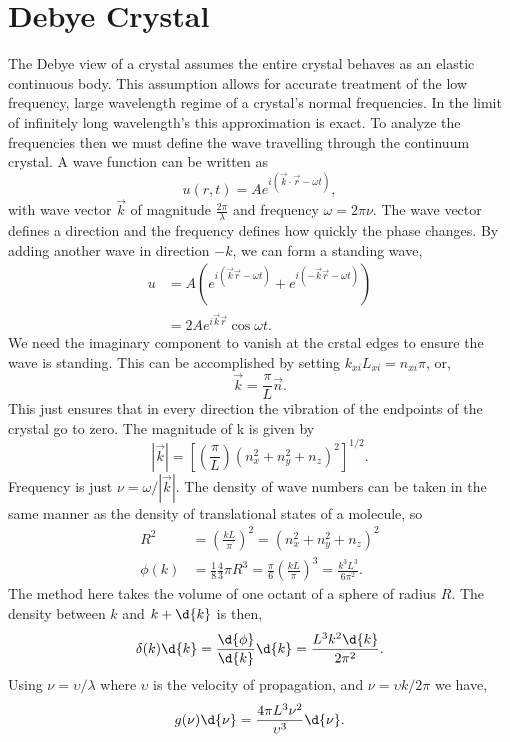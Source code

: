 \section{Debye Crystal}%
\label{sec:crystal_debye}
The Debye view of a crystal assumes the entire crystal behaves as an elastic
continuous body. This assumption allows for accurate treatment of the low
frequency, large wavelength regime of a crystal's normal frequencies. In the
limit of infinitely long wavelength's this approximation is exact. To analyze
the frequencies then we must define the wave travelling through the continuum
crystal. A wave function can be written as
 \begin{equation*}
	 u(r, t) = A e^{i(\vec{k} \cdot \vec{r} - \omega t)},
\end{equation*}
with wave vector $ \vec{k}$ of magnitude $\frac{2\pi}{\lambda}$ and frequency
$\omega = 2\pi\nu$. The wave vector defines a direction and the frequency
defines how quickly the phase changes. By adding another wave in direction $-k$,
we can form a standing wave,
\begin{align*}
	u &= A( e^{i(\vec{k} \vec{r} - \omega t)} + e^{i(-\vec{k} \vec{r} - \omega
	t)})\\
	  &= 2A e^{i \vec{k} \vec{r}} \cos{\omega t}.
\end{align*}
We need the imaginary component to vanish at the crstal edges to ensure the wave
is standing. This can be accomplished by setting $k_{xi} L_{xi} = n_{xi} \pi$,
or,
\begin{equation*}
	\vec{k} = \frac{\pi}{L} \vec{n}.
\end{equation*}
This just ensures that in every direction the vibration of the endpoints of the
crystal go to zero. The magnitude of k is given by
\begin{equation*}
	|\vec{k}| = {\left[{\left(\frac{\pi}{L}\right)}(n_{x}^2 + n_{y}^2 +
	n_{z})^2\right]}^{1/2}.
\end{equation*}
Frequency is just $\nu = \omega / |\vec{k}|$. The density of wave numbers can be
taken in the same manner as the density of translational states of a molecule,
so
\begin{align*}
	R^2 &= {\left(\frac{kL}{\pi}\right)}^2 = (n_{x}^2 + n_{y}^2 + n_{z})^2\\
	\phi(k) &= \frac{1}{8} \frac{4}{3} \pi R^3 = \frac{\pi}{6}
	{\left(\frac{kL}{\pi}\right)}^3 = \frac{k^3 L^3}{6 \pi^2}.
\end{align*}
The method here takes the volume of one octant of a sphere of radius $R$. The
density between $k$ and $k +\d{k}$ is then,
\begin{equation*}
	\delta(k) \d{k} = \frac{\d{\phi}}{\d{k}} \d{k} = \frac{L^3 k^2 \d{k}}{2
	\pi^2}.
\end{equation*}
Using $\nu = \upsilon / \lambda$ where $\upsilon$ is the velocity of
propagation, and $\nu = \upsilon k /2\pi$ we have,
\begin{equation*}
	g(\nu) \d{\nu} = \frac{4\pi L^3 \nu^2}{\upsilon^3} \d{\nu}.
\end{equation*}

